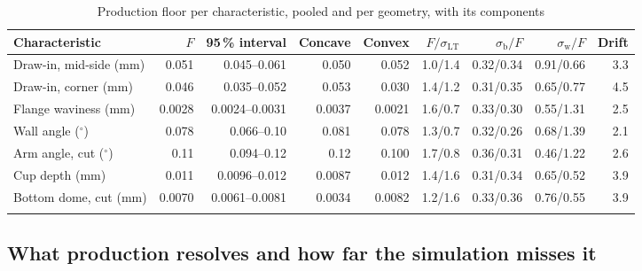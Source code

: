 \documentclass[pdflatex,sn-basic,lineno]{sn-jnl}
\newcommand{\tabsize}{\fontsize{8}{9.5}\selectfont}
\begin{document}
\begin{table}[t]
\tabsize
\setlength{\tabcolsep}{2.0pt}
\caption{Production floor per characteristic, pooled and per geometry, with its components}\label{tab:floors}
\begin{tabular}{@{}lrrrrrrrr@{}}
\toprule
Characteristic & $F$ & 95\,\% interval & Concave & Convex & $F/\sigma_\mathrm{LT}$ & $\sigma_\mathrm{b}/F$ & $\sigma_\mathrm{w}/F$ & Drift \\
\midrule
Draw-in, mid-side (mm) & 0.051 & 0.045--0.061 & 0.050 & 0.052 & 1.0/1.4 & 0.32/0.34 & 0.91/0.66 & 3.3 \\
Draw-in, corner (mm) & 0.046 & 0.035--0.052 & 0.053 & 0.030 & 1.4/1.2 & 0.31/0.35 & 0.65/0.77 & 4.5 \\
Flange waviness (mm) & 0.0028 & 0.0024--0.0031 & 0.0037 & 0.0021 & 1.6/0.7 & 0.33/0.30 & 0.55/1.31 & 2.5 \\
Wall angle ($^\circ$) & 0.078 & 0.066--0.10 & 0.081 & 0.078 & 1.3/0.7 & 0.32/0.26 & 0.68/1.39 & 2.1 \\
Arm angle, cut ($^\circ$) & 0.11 & 0.094--0.12 & 0.12 & 0.100 & 1.7/0.8 & 0.36/0.31 & 0.46/1.22 & 2.6 \\
Cup depth (mm) & 0.011 & 0.0096--0.012 & 0.0087 & 0.012 & 1.4/1.6 & 0.31/0.34 & 0.65/0.52 & 3.9 \\
Bottom dome, cut (mm) & 0.0070 & 0.0061--0.0081 & 0.0034 & 0.0082 & 1.2/1.6 & 0.33/0.36 & 0.76/0.55 & 3.9 \\
\botrule
\end{tabular}
\end{table}

\subsection{What production resolves and how far the simulation misses it}\label{sec:res-sim}
\end{document}
